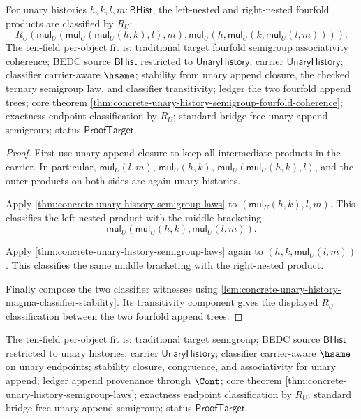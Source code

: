 \begin{theorem}
\label{thm:concrete-unary-history-semigroup-fourfold-coherence}
For unary histories $h,k,l,m:\mathsf{BHist}$, the left-nested and
right-nested fourfold products are classified by $R_U$:
$$
R_U(\mathsf{mul}_U(\mathsf{mul}_U(\mathsf{mul}_U(h,k),l),m),
\mathsf{mul}_U(h,\mathsf{mul}_U(k,\mathsf{mul}_U(l,m)))).
$$
The ten-field per-object fit is: traditional target fourfold semigroup
associativity coherence; BEDC source $\mathsf{BHist}$ restricted to
$\mathsf{UnaryHistory}$; carrier $\mathsf{UnaryHistory}$; classifier
carrier-aware $\hsame$; stability from unary append closure, the checked ternary
semigroup law, and classifier transitivity; ledger the two fourfold append
trees; core theorem
\autoref{thm:concrete-unary-history-semigroup-fourfold-coherence}; exactness
endpoint classification by $R_U$; standard bridge free unary append semigroup;
status $\mathsf{ProofTarget}$.
\end{theorem}
\begin{proof}
First use unary append closure to keep all intermediate products in the carrier.
In particular, $\mathsf{mul}_U(l,m)$, $\mathsf{mul}_U(h,k)$,
$\mathsf{mul}_U(\mathsf{mul}_U(h,k),l)$, and the outer products on both sides
are again unary histories.

Apply \autoref{thm:concrete-unary-history-semigroup-laws} to
$(\mathsf{mul}_U(h,k),l,m)$. This classifies the left-nested product with the
middle bracketing
$$
\mathsf{mul}_U(\mathsf{mul}_U(h,k),\mathsf{mul}_U(l,m)).
$$

Apply \autoref{thm:concrete-unary-history-semigroup-laws} again to
$(h,k,\mathsf{mul}_U(l,m))$. This classifies the same middle bracketing with
the right-nested product.

Finally compose the two classifier witnesses using
\autoref{lem:concrete-unary-history-magma-classifier-stability}. Its
transitivity component gives the displayed $R_U$ classification between the two
fourfold append trees.
\end{proof}

The ten-field per-object fit is: traditional target semigroup; BEDC source
$\mathsf{BHist}$ restricted to unary histories; carrier $\mathsf{UnaryHistory}$;
classifier carrier-aware $\hsame$ on unary endpoints; stability closure,
congruence, and associativity for unary append; ledger append provenance
through $\Cont$; core theorem
\autoref{thm:concrete-unary-history-semigroup-laws}; exactness endpoint
classification by $R_U$; standard bridge free unary append semigroup; status
$\mathsf{ProofTarget}$.

